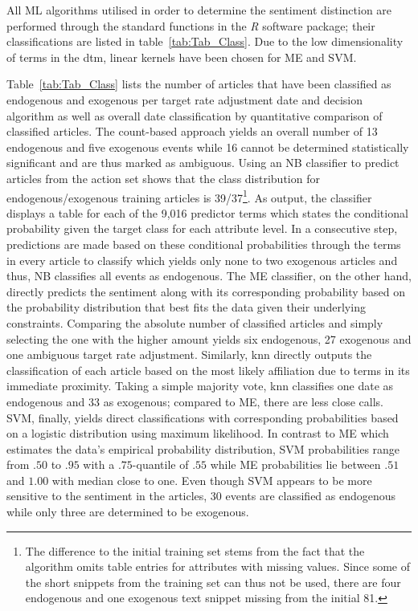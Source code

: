 All ML algorithms utilised in order to determine the sentiment distinction are performed through the standard functions in the \textit{R} software package; their classifications are listed in table~\vref{tab:Tab_Class}. Due to the low dimensionality of terms in the dtm, linear kernels have been chosen for ME and SVM.
%

%
%
%
Table~\vref{tab:Tab_Class} lists the number of articles that have been classified as endogenous and exogenous per target rate adjustment date and decision algorithm as well as overall date classification by quantitative comparison of classified articles. The count-based approach yields an overall number of 13 endogenous and five exogenous events while 16 cannot be determined statistically significant and are thus marked as ambiguous.
%
%
Using an NB classifier to predict articles from the action set shows that the class distribution for endogenous/exogenous training articles is 39/37\footnote{The difference to the initial training set stems from the fact that the algorithm omits table entries for attributes with missing values. Since some of the short snippets from the training set can thus not be used, there are four endogenous and one exogenous text snippet missing from the initial 81.}. As output, the classifier displays a table for each of the 9,016 predictor terms which states the conditional probability given the target class for each attribute level. In a consecutive step, predictions are made based on these conditional probabilities through the terms in every article to classify which yields only none to two exogenous articles and thus, NB classifies all events as endogenous. 
%
%
The ME classifier, on the other hand, directly predicts the sentiment along with its corresponding probability based on the probability distribution that best fits the data given their underlying constraints. Comparing the absolute number of classified articles and simply selecting the one with the higher amount yields six endogenous, 27 exogenous and one ambiguous target rate adjustment. 
%
%
Similarly, knn directly outputs the classification of each article based on the most likely affiliation due to terms in its immediate proximity. Taking a simple majority vote, knn classifies one date as endogenous and 33 as exogenous; compared to ME, there are less close calls. 
%
%
SVM, finally, yields direct classifications with corresponding probabilities based on a logistic distribution using maximum likelihood. In contrast to ME which estimates the data's empirical probability distribution, SVM probabilities range from $.50$ to $.95$ with a $.75$-quantile of $.55$ while ME probabilities lie between $.51$ and $1.00$ with median close to one. Even though SVM appears to be more sensitive to the sentiment in the articles, 30 events are classified as endogenous while only three are determined to be exogenous.

